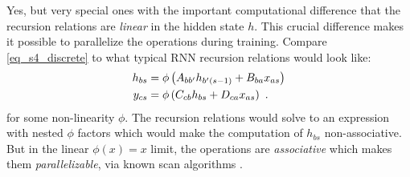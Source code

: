 Yes, but very special ones with the important computational difference that the recursion relations
are \textit{linear} in the hidden state $ h $. This crucial difference makes it possible to
parallelize the operations during training. Compare \eqref{eq_s4_discrete} to what typical RNN
recursion relations would look like:
\begin{align}
    h  _{ bs } &= \phi \left (A  _{ b b' }h _{ b' (s-1) } + B  _{ b a }x  _{ as }\right )\nonumber\\
    y  _{ cs } &= \phi\left (C _{ c b }h  _{ bs } + D _{ c a }x  _{ as }\right ) \label{eq_rnn_comparison} \ .
\end{align}
for some non-linearity $ \phi $.  The recursion relations would solve to an expression with nested
$ \phi $ factors which would make the computation of $ h _{ bs } $ non-associative. But in the linear $
\phi(x) = x$ limit, the operations are \textit{associative} which makes them
\textit{parallelizable}, via known scan algorithms \cite{prefixSumsBlelloch}.





